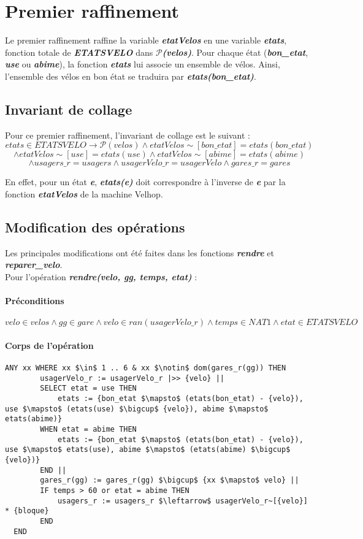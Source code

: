 \documentclass[12pt]{article}
\begin{document}
\section{Premier raffinement}
Le premier raffinement raffine la variable \textit{\textbf{etatVelos}} en une variable \textit{\textbf{etats}}, fonction totale de \textit{\textbf{ETATSVELO}} dans \textit{\textbf{$\mathcal{P}$(velos)}}. Pour chaque état (\textit{\textbf{bon\_etat}}, \textit{\textbf{use}} ou \textit{\textbf{abime}}), la fonction \textit{\textbf{etats}} lui associe un ensemble de vélos. Ainsi, l'ensemble des vélos en bon état se traduira par \textit{\textbf{etats(bon\_etat)}}.
\subsection{Invariant de collage}
Pour ce premier raffinement, l'invariant de collage est le suivant : \\
\[ etats \in ETATSVELO \rightarrow \mathcal{P}(velos) \land etatVelos\sim[{bon\_etat}] = etats(bon\_etat) \]
\[ \land etatVelos\sim[{use}] = etats(use) \land etatVelos\sim[{abime}] = etats(abime) \]
\[ \land usagers\_r = usagers \land usagerVelo\_r = usagerVelo \land gares\_r = gares \]

En effet, pour un état \textit{\textbf{e}}, \textit{\textbf{etats(e)}} doit correspondre à l'inverse de \textit{\textbf{e}} par la fonction \textit{\textbf{etatVelos}} de la machine Velhop.
\subsection{Modification des opérations}
Les principales modifications ont été faites dans les fonctions \textit{\textbf{rendre}} et \textit{\textbf{reparer\_velo}}. \\

Pour l'opération \textit{\textbf{rendre(velo, gg, temps, etat)}} :
\paragraph{Préconditions}
\[ velo \in velos \land gg \in gare \land velo \in ran(usagerVelo\_r) \land temps \in NAT1 \land etat \in ETATSVELO\]
\paragraph{Corps de l'opération}
\textbf{}
\begin{lstlisting}[mathescape]
  ANY xx WHERE xx $\in$ 1 .. 6 & xx $\notin$ dom(gares_r(gg)) THEN
        usagerVelo_r := usagerVelo_r |>> {velo} ||
        SELECT etat = use THEN
            etats := {bon_etat $\mapsto$ (etats(bon_etat) - {velo}), use $\mapsto$ (etats(use) $\bigcup$ {velo}), abime $\mapsto$ etats(abime)}
        WHEN etat = abime THEN
            etats := {bon_etat $\mapsto$ (etats(bon_etat) - {velo}), use $\mapsto$ etats(use), abime $\mapsto$ (etats(abime) $\bigcup$ {velo})}
        END ||
        gares_r(gg) := gares_r(gg) $\bigcup$ {xx $\mapsto$ velo} ||
        IF temps > 60 or etat = abime THEN
            usagers_r := usagers_r $\leftarrow$ usagerVelo_r~[{velo}] * {bloque}
        END
  END
\end{lstlisting}
\end{document}
